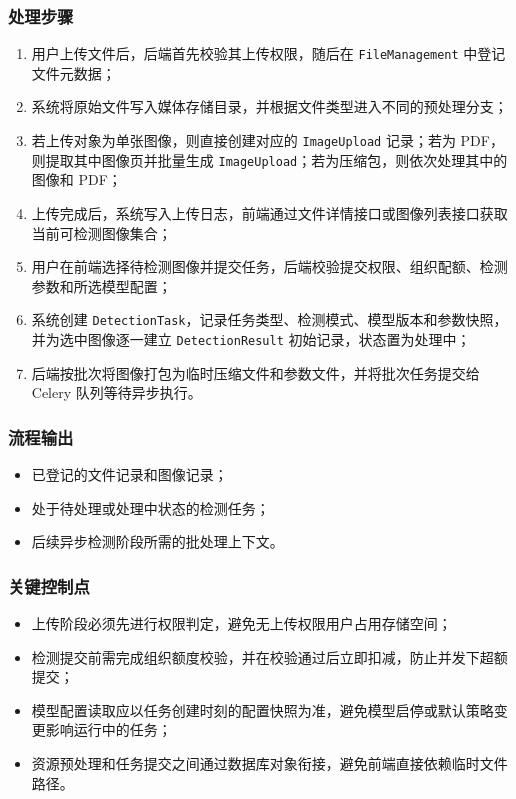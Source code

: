 \subsubsection{处理步骤}
\begin{enumerate}[leftmargin=2em]
    \item 用户上传文件后，后端首先校验其上传权限，随后在 \texttt{FileManagement} 中登记文件元数据；
    \item 系统将原始文件写入媒体存储目录，并根据文件类型进入不同的预处理分支；
    \item 若上传对象为单张图像，则直接创建对应的 \texttt{ImageUpload} 记录；若为 PDF，则提取其中图像页并批量生成 \texttt{ImageUpload}；若为压缩包，则依次处理其中的图像和 PDF；
    \item 上传完成后，系统写入上传日志，前端通过文件详情接口或图像列表接口获取当前可检测图像集合；
    \item 用户在前端选择待检测图像并提交任务，后端校验提交权限、组织配额、检测参数和所选模型配置；
    \item 系统创建 \texttt{DetectionTask}，记录任务类型、检测模式、模型版本和参数快照，并为选中图像逐一建立 \texttt{DetectionResult} 初始记录，状态置为处理中；
    \item 后端按批次将图像打包为临时压缩文件和参数文件，并将批次任务提交给 Celery 队列等待异步执行。
\end{enumerate}

\subsubsection{流程输出}
\begin{itemize}[leftmargin=2em]
    \item 已登记的文件记录和图像记录；
    \item 处于待处理或处理中状态的检测任务；
    \item 后续异步检测阶段所需的批处理上下文。
\end{itemize}

\subsubsection{关键控制点}
\begin{itemize}[leftmargin=2em]
    \item 上传阶段必须先进行权限判定，避免无上传权限用户占用存储空间；
    \item 检测提交前需完成组织额度校验，并在校验通过后立即扣减，防止并发下超额提交；
    \item 模型配置读取应以任务创建时刻的配置快照为准，避免模型启停或默认策略变更影响运行中的任务；
    \item 资源预处理和任务提交之间通过数据库对象衔接，避免前端直接依赖临时文件路径。
\end{itemize}

